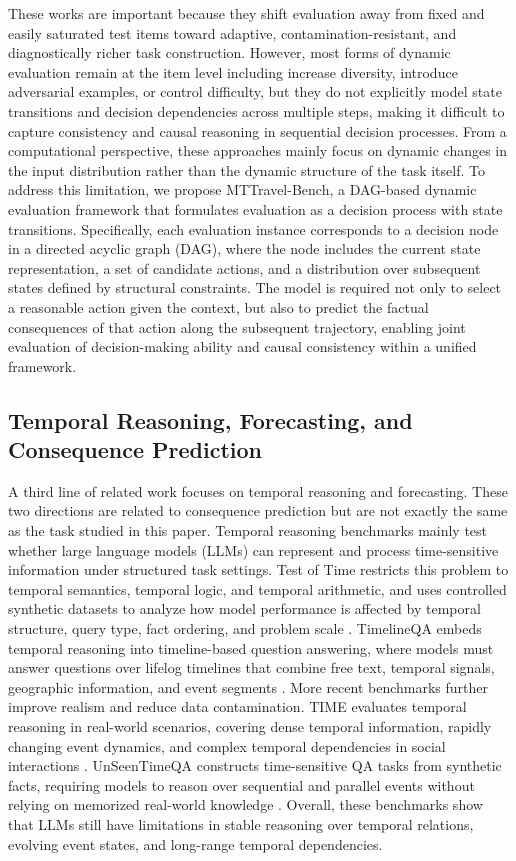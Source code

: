 \documentclass[pdflatex,sn-mathphys-num]{sn-jnl}%
\theoremstyle{thmstyleone}%
\theoremstyle{thmstyletwo}%
\theoremstyle{thmstylethree}%
\begin{document}
These works are important because they shift evaluation away from fixed and easily saturated test items toward adaptive, contamination-resistant, and diagnostically richer task construction. However, most forms of dynamic evaluation remain at the item level including increase diversity, introduce adversarial examples, or control difficulty, but they do not explicitly model state transitions and decision dependencies across multiple steps, making it difficult to capture consistency and causal reasoning in sequential decision processes. From a computational perspective, these approaches mainly focus on dynamic changes in the input distribution rather than the dynamic structure of the task itself. To address this limitation, we propose MTTravel-Bench, a DAG-based dynamic evaluation framework that formulates evaluation as a decision process with state transitions. Specifically, each evaluation instance corresponds to a decision node in a directed acyclic graph (DAG), where the node includes the current state representation, a set of candidate actions, and a distribution over subsequent states defined by structural constraints. The model is required not only to select a reasonable action given the context, but also to predict the factual consequences of that action along the subsequent trajectory, enabling joint evaluation of decision-making ability and causal consistency within a unified framework.

\subsection{Temporal Reasoning, Forecasting, and Consequence Prediction}
A third line of related work focuses on temporal reasoning and forecasting. These two directions are related to consequence prediction but are not exactly the same as the task studied in this paper. Temporal reasoning benchmarks mainly test whether large language models (LLMs) can represent and process time-sensitive information under structured task settings. Test of Time restricts this problem to temporal semantics, temporal logic, and temporal arithmetic, and uses controlled synthetic datasets to analyze how model performance is affected by temporal structure, query type, fact ordering, and problem scale \cite{fatemi2024test}. TimelineQA embeds temporal reasoning into timeline-based question answering, where models must answer questions over lifelog timelines that combine free text, temporal signals, geographic information, and event segments \cite{tan2023timelineqa}. More recent benchmarks further improve realism and reduce data contamination. TIME evaluates temporal reasoning in real-world scenarios, covering dense temporal information, rapidly changing event dynamics, and complex temporal dependencies in social interactions \cite{wei2025time}. UnSeenTimeQA constructs time-sensitive QA tasks from synthetic facts, requiring models to reason over sequential and parallel events without relying on memorized real-world knowledge \cite{uddin2024unseentimeqa}. Overall, these benchmarks show that LLMs still have limitations in stable reasoning over temporal relations, evolving event states, and long-range temporal dependencies.
\end{document}
